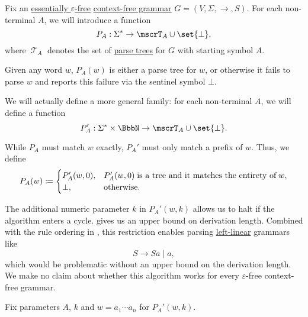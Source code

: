 \begin{algorithm}\label{alg:recursive_descent_parsing}
  Fix an \hyperref[def:epsilon_free_grammar]{essentially \( \varepsilon \)-free} \hyperref[def:chomsky_hierarchy/context_free]{context-free grammar} \( G = (V, \Sigma, \to, S) \). For each non-terminal \( A \), we will introduce a function
  \begin{equation*}
    P_A: \Sigma^* \to \mscrT_A \cup \set{ \bot },
  \end{equation*}
  where \( \mscrT_A \) denotes the set of \hyperref[def:parse_tree]{parse trees} for \( G \) with starting symbol \( A \).

  Given any word \( w \), \( P_A(w) \) is either a parse tree for \( w \), or otherwise it fails to parse \( w \) and reports this failure via the sentinel symbol \( \bot \).

  We will actually define a more general family: for each non-terminal \( A \), we will define a function
  \begin{equation*}
    P_A': \Sigma^* \times \BbbN \to \mscrT_A \cup \set{ \bot }.
  \end{equation*}

  While \( P_A \) must match \( w \) exactly, \( P_A' \) must only match a prefix of \( w \). Thus, we define
  \begin{equation*}
    P_A(w) \coloneqq \begin{cases}
      P_A'(w, 0), &P_A'(w, 0) \T{is a tree and it matches the entirety of} w, \\
      \bot,       &\T{otherwise.}
    \end{cases}
  \end{equation*}

  The additional numeric parameter \( k \) in \( P_A'(w, k) \) allows us to halt if the algorithm enters a cycle.  gives us an upper bound on derivation length. Combined with the rule ordering in , this restriction enables parsing \hyperref[def:chomsky_hierarchy/regular]{left-linear} grammars like
  \begin{equation*}
    S \to Sa \mid a,
  \end{equation*}
  which would be problematic without an upper bound on the derivation length. We make no claim about whether this algorithm works for every \( \varepsilon \)-free context-free grammar.

  Fix parameters \( A \), \( k \) and \( w = a_1 \cdots a_n \) for \( P_A'(w, k) \).


\end{algorithm}
